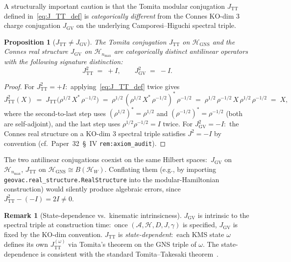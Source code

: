 \documentclass[11pt,a4paper]{article}
\theoremstyle{plain}
\newtheorem{proposition}[theorem]{Proposition}
\theoremstyle{definition}
\newtheorem{remark}[theorem]{Remark}
\newcommand{\nmax}{n_{\max}}
\newcommand{\Hilb}{\mathcal{H}}
\newcommand{\Acal}{\mathcal{A}}
\newcommand{\TT}{\mathrm{TT}}
\newcommand{\GNS}{\mathrm{GNS}}
\begin{document}
A structurally important caution is that the Tomita modular
conjugation $J_{\TT}$ defined in~\eqref{eq:J_TT_def} is
\emph{categorically different} from the Connes KO-dim 3 charge
conjugation $J_{\mathrm{GV}}$ on the underlying Camporesi--Higuchi
spectral triple.

\begin{proposition}[$J_{\TT} \ne J_{\mathrm{GV}}$]\label{prop:J_TT_distinct}
The Tomita conjugation $J_{\TT}$ on $\Hilb_{\GNS}$ and the Connes
real structure $J_{\mathrm{GV}}$ on $\Hilb_{\nmax}$ are categorically
distinct antilinear operators with the following signature distinction:
\begin{equation}\label{eq:J_signatures}
   J_{\TT}^2 \;=\; +I, \qquad J_{\mathrm{GV}}^2 \;=\; -I.
\end{equation}
\end{proposition}

\begin{proof}
For $J_{\TT}^2 = +I$:\ applying~\eqref{eq:J_TT_def} twice gives
\begin{equation*}
   J_{\TT}^2(X)
   \;=\; J_{\TT}\bigl(\rho^{1/2}\, X^*\, \rho^{-1/2}\bigr)
   \;=\; \rho^{1/2}\,(\rho^{1/2}\, X^*\, \rho^{-1/2})^*\, \rho^{-1/2}
   \;=\; \rho^{1/2}\, \rho^{-1/2}\, X\, \rho^{1/2}\, \rho^{-1/2}
   \;=\; X,
\end{equation*}
where the second-to-last step uses $(\rho^{1/2})^* = \rho^{1/2}$ and
$(\rho^{-1/2})^* = \rho^{-1/2}$ (both are self-adjoint), and the last
step uses $\rho^{1/2} \rho^{-1/2} = I$ twice. For $J_{\mathrm{GV}}^2 = -I$:\
the Connes real structure on a KO-dim 3 spectral triple satisfies
$J^2 = -I$ by convention (cf.~Paper~32~\S~IV
\texttt{rem:axiom\_audit}).
\end{proof}

The two antilinear conjugations coexist on the same Hilbert spaces:\
$J_{\mathrm{GV}}$ on $\Hilb_{\nmax}$, $J_{\TT}$ on $\Hilb_{\GNS} \cong
B(\Hilb_W)$. Conflating them (e.g., by importing
\texttt{geovac.real\_structure.RealStructure} into the
modular-Hamiltonian construction) would silently produce algebraic
errors, since $J_{\TT}^2 - (-I) = 2I \ne 0$.

\begin{remark}[State-dependence vs.\ kinematic intrinsicness]
\label{rem:state_dependent}
$J_{\mathrm{GV}}$ is intrinsic to the spectral triple at construction
time:\ once $(\Acal, \Hilb, D, J, \gamma)$ is specified,
$J_{\mathrm{GV}}$ is fixed by the KO-dim convention. $J_{\TT}$ is
\emph{state-dependent}:\ each KMS state $\omega$ defines its own
$J_{\TT}^{(\omega)}$ via Tomita's theorem
on the GNS triple of $\omega$. The state-dependence is consistent
with the standard Tomita--Takesaki theorem~\cite{takesaki1970, tomita1967}.
\end{remark}
\end{document}
